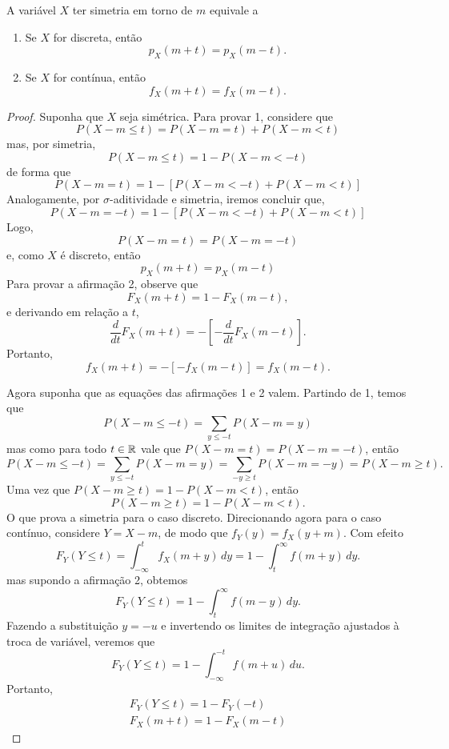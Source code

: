 \begin{thm:simetria funcao de probabilidade}
\label{thm:simetria funcao de probabilidade}
A variável $X$ ter simetria em torno de $m$ equivale a
\begin{enumerate}
\item Se $X$ for discreta, então
\[
    p_X(m+t) = p_X(m-t).
\]

\item Se $X$ for contínua, então
\[
    f_X(m+t) = f_X(m-t).
\]
\end{enumerate}
\end{thm:simetria funcao de probabilidade}
\begin{proof}
Suponha que $X$ seja simétrica.
Para provar 1, considere que
\[
    P(X - m \le t) = P(X - m = t) + P(X - m < t)
\]
mas, por simetria,
\[
    P(X - m \le t) = 1 - P(X - m < -t)
\]
de forma que
\[
    P(X - m = t) = 1 - [P(X - m < -t) + P(X - m < t)]
\]
Analogamente, por $\sigma$-aditividade e simetria, iremos concluir que,
\[
    P(X - m = -t) = 1 - [P(X - m < -t) + P(X - m < t)]
\]
Logo,
\[
    P(X - m = t) = P(X - m = -t)
\]
e, como $X$ é discreto, então
\[
    p_X(m+t) = p_X(m-t)
\]
Para provar a afirmação 2, observe que
\[
    F_X(m+t) = 1 - F_X(m-t),
\]
e derivando em relação a $t$,
\[
     \frac{d}{dt} F_X(m+t) = - \left[-\frac{d}{dt} F_X(m-t)\right].
\]
Portanto,
\[
     f_X(m+t) = - [-f_X(m-t)] = f_X(m-t).
\]

Agora suponha que as equações das afirmações 1 e 2 valem.
Partindo de 1, temos que
\[
    P(X-m \le -t) = \sum_{y \le -t} P(X-m=y)
\]
mas como para todo $t \in \mathbb{R}$ vale que $P(X-m=t) = P(X-m=-t)$, então
\[
    P(X-m \le -t) = \sum_{y \le -t} P(X-m=y) = \sum_{-y \ge t} P(X-m=-y) = P(X-m \ge t).
\]
Uma vez que $P(X-m \ge t) = 1 - P(X-m < t)$, então
\[
    P(X - m \ge t) = 1 - P(X - m < t).
\]
O que prova a simetria para o caso discreto.
Direcionando agora para o caso contínuo, considere $Y = X - m$, de modo que
$f_Y(y) = f_X(y+m)$.
Com efeito
\[
    F_Y(Y \le t) = \int_{-\infty}^{t} f_X(m+y)\,dy = 1 - \int_{t}^{\infty} f(m+y)\,dy.
\]
mas supondo a afirmação 2, obtemos
\[
    F_Y(Y \le t) = 1 - \int_{t}^{\infty} f(m-y)\,dy.
\]
Fazendo a substituição $y = -u$ e invertendo os limites de integração ajustados à troca
de variável, veremos que
\[
    F_Y(Y \le t) = 1 - \int_{-\infty}^{-t} f(m+u)\,du.
\]
Portanto,
\begin{gather*}
    F_Y(Y \le t) = 1 - F_Y(-t) \\
    F_X(m+t) = 1 - F_X(m-t)
\end{gather*}
\end{proof}

